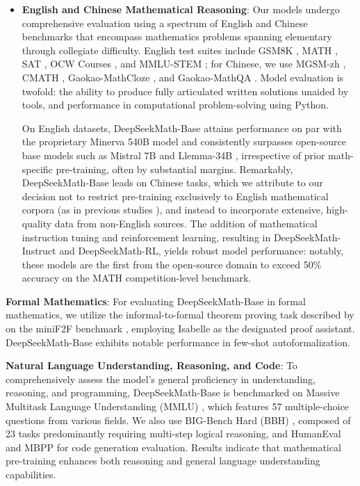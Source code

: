 \begin{itemize}[topsep=0pt]
    \item \textbf{English and Chinese Mathematical Reasoning}: Our models undergo comprehensive evaluation using a spectrum of English and Chinese benchmarks that encompass mathematics problems spanning elementary through collegiate difficulty. English test suites include GSM8K \citep{gsm8k}, MATH \citep{MATH}, SAT \citep{llemma}, OCW Courses \citep{minerva}, and MMLU-STEM \citep{mmlu}; for Chinese, we use MGSM-zh \citep{mgsm}, CMATH \citep{wei2023cmath}, Gaokao-MathCloze \citep{agieval}, and Gaokao-MathQA \citep{agieval}. Model evaluation is twofold: the ability to produce fully articulated written solutions unaided by tools, and performance in computational problem-solving using Python.

    On English datasets, DeepSeekMath-Base attains performance on par with the proprietary Minerva 540B model \citep{minerva} and consistently surpasses open-source base models such as Mistral 7B \citep{mistral} and Llemma-34B \citep{llemma}, irrespective of prior math-specific pre-training, often by substantial margins. Remarkably, DeepSeekMath-Base leads on Chinese tasks, which we attribute to our decision not to restrict pre-training exclusively to English mathematical corpora (as in previous studies \citep{minerva,llemma}), and instead to incorporate extensive, high-quality data from non-English sources. The addition of mathematical instruction tuning and reinforcement learning, resulting in DeepSeekMath-Instruct and DeepSeekMath-RL, yields robust model performance: notably, these models are the first from the open-source domain to exceed 50\% accuracy on the MATH competition-level benchmark.
\end{itemize}

\item \textbf{Formal Mathematics}: For evaluating DeepSeekMath-Base in formal mathematics, we utilize the informal-to-formal theorem proving task described by \citep{dsp_proof} on the miniF2F benchmark \citep{minif2f}, employing Isabelle \citep{isabelle} as the designated proof assistant. DeepSeekMath-Base exhibits notable performance in few-shot autoformalization.

\item \textbf{Natural Language Understanding, Reasoning, and Code}: To comprehensively assess the model's general proficiency in understanding, reasoning, and programming, DeepSeekMath-Base is benchmarked on Massive Multitask Language Understanding (MMLU) \citep{mmlu}, which features 57 multiple-choice questions from various fields. We also use BIG-Bench Hard (BBH) \citep{bbh}, composed of 23 tasks predominantly requiring multi-step logical reasoning, and HumanEval \citep{codex} and MBPP \citep{mbpp} for code generation evaluation. Results indicate that mathematical pre-training enhances both reasoning and general language understanding capabilities.

